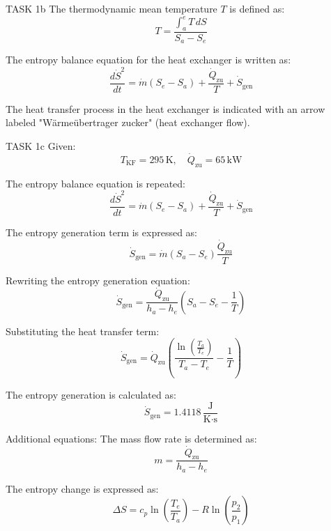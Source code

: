 TASK 1b  
The thermodynamic mean temperature \( T \) is defined as:  
\[
T = \frac{\int_a^e T \, dS}{S_a - S_e}
\]

The entropy balance equation for the heat exchanger is written as:  
\[
\frac{d\dot{S}^2}{dt} = \dot{m}(S_e - S_a) + \frac{\dot{Q}_{\text{zu}}}{T} + \dot{S}_{\text{gen}}
\]

The heat transfer process in the heat exchanger is indicated with an arrow labeled "Wärmeübertrager zucker" (heat exchanger flow).

TASK 1c  
Given:  
\[
T_{\text{KF}} = 295 \, \text{K}, \quad \dot{Q}_{\text{zu}} = 65 \, \text{kW}
\]

The entropy balance equation is repeated:  
\[
\frac{d\dot{S}^2}{dt} = \dot{m}(S_e - S_a) + \frac{\dot{Q}_{\text{zu}}}{T} + \dot{S}_{\text{gen}}
\]

The entropy generation term is expressed as:  
\[
\dot{S}_{\text{gen}} = \dot{m}(S_a - S_e) \frac{\dot{Q}_{\text{zu}}}{T}
\]

Rewriting the entropy generation equation:  
\[
\dot{S}_{\text{gen}} = \frac{\dot{Q}_{\text{zu}}}{h_a - h_e} \left( S_a - S_e - \frac{1}{T} \right)
\]

Substituting the heat transfer term:  
\[
\dot{S}_{\text{gen}} = \dot{Q}_{\text{zu}} \left( \frac{\ln \left( \frac{T_a}{T_e} \right)}{T_a - T_e} - \frac{1}{T} \right)
\]

The entropy generation is calculated as:  
\[
\dot{S}_{\text{gen}} = 1.4118 \, \frac{\text{J}}{\text{K·s}}
\]

Additional equations:  
The mass flow rate is determined as:  
\[
m = \frac{\dot{Q}_{\text{zu}}}{h_a - h_e}
\]

The entropy change is expressed as:  
\[
\Delta S = c_p \ln \left( \frac{T_e}{T_a} \right) - R \ln \left( \frac{p_2}{p_1} \right)
\]